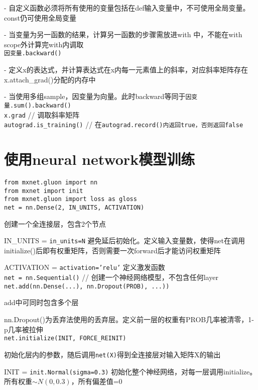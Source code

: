 \documentclass[UTF8]{ctexart}
\begin{document}
  - 自定义函数必须将所有使用的变量包括在def输入变量中，不可使用全局变量。const仍可使用全局变量
  
  - 当变量为另一函数的结果，计算另一函数的步骤需放进with 中，不能在with scope外计算完with内调取\\
\texttt{因变量.backward()}
  
  - 定义x的表达式，并计算表达式在x内每一元素值上的斜率，对应斜率矩阵存在x.attach\_grad()分配的内存中
  
  - 当使用多组sample，因变量为向量。此时backward等同于\texttt{因变量.sum().backward()}\\
\texttt{x.grad} // 调取斜率矩阵\\
\texttt{autograd.is\_training()} // 在\texttt{autograd.record()内返回true，否则返回false}

\section{使用neural network模型训练}

\noindent \texttt{from mxnet.gluon import nn}\\
\texttt{from mxnet import init}\\
\texttt{from mxnet.gluon import loss as gloss}\\
\texttt{net = nn.Dense(2, IN\_UNITS, ACTIVATION)}

  创建一个全连接层，包含2个节点

  IN\_UNITS = \texttt{in\_units=N} 避免延后初始化。定义输入变量数，使得net在调用initialize()后即有权重矩阵，否则需要一次forward后才能访问权重矩阵
  
  ACTIVATION = \texttt{activation='relu'} 定义激发函数\\
\texttt{net = nn.Sequential()} // 创建一个神经网络模型，不包含任何layer\\
\texttt{net.add(nn.Dense(...), nn.Dropout(PROB), ...))}

  add中可同时包含多个层
  
  nn.Dropout()为丢弃法使用的丢弃层。定义前一层的权重有PROB几率被清零，1-p几率被拉伸\\
\texttt{net.initialize(INIT, FORCE\_REINIT)} 

  初始化层内的参数，随后调用\texttt{net(X)}得到全连接层对输入矩阵X的输出
  
  INIT = \texttt{init.Normal(sigma=0.3)} 初始化整个神经网络，对每一层调用initialize。所有权重$\sim N(0, 0.3)$，所有偏差值=0
\end{document}
